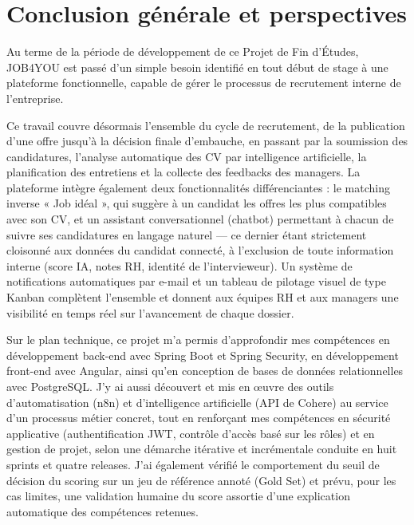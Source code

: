 \chapter*{Conclusion générale et perspectives}

Au terme de la période de développement de ce Projet de Fin d’Études, JOB4YOU est passé d’un simple besoin identifié en tout début de stage à une plateforme fonctionnelle, capable de gérer le processus de recrutement interne de l’entreprise.

Ce travail couvre désormais l’ensemble du cycle de recrutement, de la publication d’une offre jusqu’à la décision finale d’embauche, en passant par la soumission des candidatures, l’analyse automatique des CV par intelligence artificielle, la planification des entretiens et la collecte des feedbacks des managers. La plateforme intègre également deux fonctionnalités différenciantes : le matching inverse « Job idéal », qui suggère à un candidat les offres les plus compatibles avec son CV, et un assistant conversationnel (chatbot) permettant à chacun de suivre ses candidatures en langage naturel — ce dernier étant strictement cloisonné aux données du candidat connecté, à l’exclusion de toute information interne (score IA, notes RH, identité de l’intervieweur). Un système de notifications automatiques par e-mail et un tableau de pilotage visuel de type Kanban complètent l’ensemble et donnent aux équipes RH et aux managers une visibilité en temps réel sur l’avancement de chaque dossier.

Sur le plan technique, ce projet m’a permis d’approfondir mes compétences en développement back-end avec Spring Boot et Spring Security, en développement front-end avec Angular, ainsi qu’en conception de bases de données relationnelles avec PostgreSQL. J’y ai aussi découvert et mis en œuvre des outils d’automatisation (n8n) et d’intelligence artificielle (API de Cohere) au service d’un processus métier concret, tout en renforçant mes compétences en sécurité applicative (authentification JWT, contrôle d’accès basé sur les rôles) et en gestion de projet, selon une démarche itérative et incrémentale conduite en huit sprints et quatre releases. J’ai également vérifié le comportement du seuil de décision du scoring sur un jeu de référence annoté (Gold Set) et prévu, pour les cas limites, une validation humaine du score assortie d’une explication automatique des compétences retenues.

